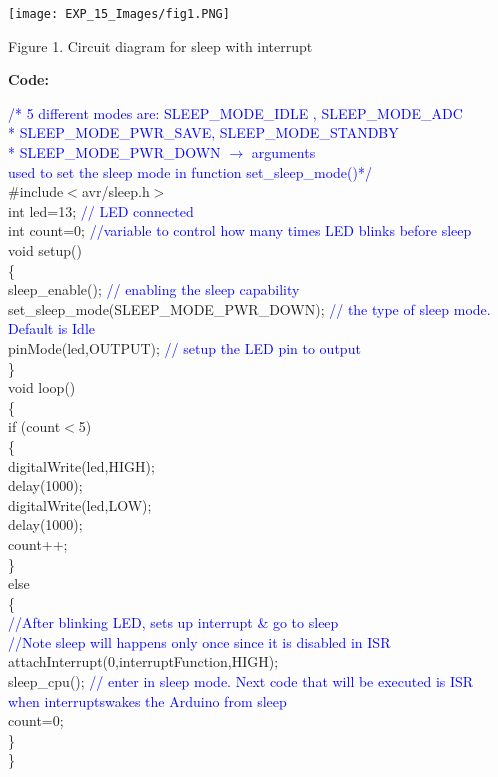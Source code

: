 \documentclass[12pt,a4paper]{article}
\begin{document}
\begin{center} 
\texttt{[image: EXP\_15\_Images/fig1.PNG]}
\end{center}
\begin{center} {Figure 1. Circuit diagram for sleep with interrupt}\end{center}

\hspace{1.5cm}\textbf{\large Code:}\\[6pt]
\setlength{\parindent}{8eM}

\textcolor{blue}{/* 5 different modes are:  SLEEP\_MODE\_IDLE , SLEEP\_MODE\_ADC\\
 *  SLEEP\_MODE\_PWR\_SAVE, SLEEP\_MODE\_STANDBY\\
 *  SLEEP\_MODE\_PWR\_DOWN $\rightarrow$ arguments\\ used to set the sleep mode in function set\_sleep\_mode()*/}\\
\#include$<$avr/sleep.h$>$\\
int led=13; \textcolor{blue}{// LED connected}\\
 int count=0;\textcolor{blue}{ //variable to control how many times LED blinks before sleep}\\[14pt]

 void setup()\\
 \{\\
  sleep\_enable(); \textcolor{blue}{ // enabling the sleep capability}\\
  set\_sleep\_mode(SLEEP\_MODE\_PWR\_DOWN);  \textcolor{blue}{// the type of sleep mode.\\ Default is Idle}\\
  pinMode(led,OUTPUT); \textcolor{blue}{// setup the LED pin to output}\\
 \}\\[14pt]

 void loop()\\
 \{\\
  if (count$<$5)\\
    \{\\
      digitalWrite(led,HIGH);\\
      delay(1000);\\
      digitalWrite(led,LOW);\\
      delay(1000);\\
      count++;\\
      \}\\
    else\\
     \{\\
\textcolor{blue}{//After blinking LED, sets up interrupt & go to sleep\\
      //Note sleep will happens only once since it is disabled in ISR}\\
      attachInterrupt(0,interruptFunction,HIGH);\\
      sleep\_cpu(); \textcolor{blue}{// enter in sleep mode. Next code that will be executed is ISR \\
      when interruptswakes the Arduino from sleep}\\
      count=0;\\
    \} \\      
 \}\\[14pt]
 
\end{document}
